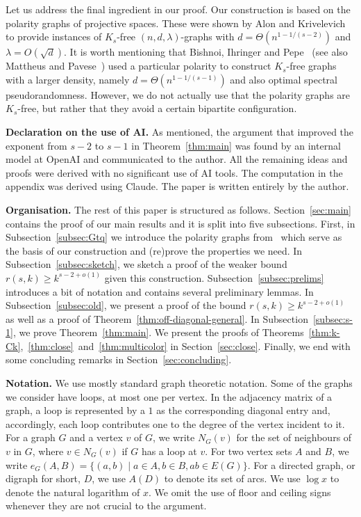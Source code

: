 \documentclass{article}
\theoremstyle{plain}
\theoremstyle{definition}
\begin{document}
Let us address the final ingredient in our proof. Our construction is based on the polarity graphs of projective spaces. These were shown by Alon and Krivelevich~\cite{alon-krivelevich} to provide instances of $K_s$-free $(n, d, \lambda)$-graphs with $d = \Theta(n^{1 - 1/(s-2)})$ and $\lambda = O(\sqrt{d})$. It is worth mentioning that Bishnoi, Ihringer and Pepe~\cite{bishnoiihringer} (see also Mattheus and Pavese~\cite{mattheus-pavese}) used a particular polarity to construct $K_s$-free graphs with a larger density, namely $d = \Theta(n^{1 - 1 / (s-1)})$ and also optimal spectral pseudorandomness. However, we do not actually use that the polarity graphs are $K_s$-free, but rather that they avoid a certain bipartite configuration.

\textbf{Declaration on the use of AI.} As mentioned, the argument that improved the exponent from $s-2$ to $s-1$ in Theorem~\ref{thm:main} was found by an internal model at OpenAI and communicated to the author. All the remaining ideas and proofs were derived with no significant use of AI tools. The computation in the appendix was derived using Claude. The paper is written entirely by the author.

\textbf{Organisation.} The rest of this paper is structured as follows. Section~\ref{sec:main} contains the proof of our main results and it is split into five subsections. First, in Subsection~\ref{subsec:Gtq} we introduce the polarity graphs from~\cite{alon-krivelevich} which serve as the basis of our construction and (re)prove the properties we need. In Subsection~\ref{subsec:sketch}, we sketch a proof of the weaker bound $r(s, k) \ge k^{s-2 + o(1)}$ given this construction. Subsection~\ref{subsec:prelims} introduces a bit of notation and contains several preliminary lemmas. In Subsection~\ref{subsec:old}, we present a proof of the bound $r(s, k) \ge k^{s-2 + o(1)}$ as well as a proof of Theorem~\ref{thm:off-diagonal-general}. In Subsection~\ref{subsec:s-1}, we prove Theorem~\ref{thm:main}. We present the proofs of Theorems~\ref{thm:k-Ck},~\ref{thm:close}~and~\ref{thm:multicolor} in Section~\ref{sec:close}. Finally, we end with some concluding remarks in Section~\ref{sec:concluding}.

\textbf{Notation.} We use mostly standard graph theoretic notation. Some of the graphs we consider have loops, at most one per vertex. In the adjacency matrix of a graph, a loop is represented by a $1$ as the corresponding diagonal entry and, accordingly, each loop contributes one to the degree of the vertex incident to it. For a graph $G$ and a vertex $v$ of $G$, we write $N_G(v)$ for the set of neighbours of $v$ in $G$, where $v \in N_G(v)$ if $G$ has a loop at $v$. For two vertex sets $A$ and $B$, we write $e_G(A, B) = \{ (a, b) \mid a \in A, b \in B, ab \in E(G) \}.$ For a directed graph, or digraph for short, $D$, we use $A(D)$ to denote its set of arcs. We use $\log x$ to denote the natural logarithm of $x$. We omit the use of floor and ceiling signs whenever they are not crucial to the argument.
\end{document}
